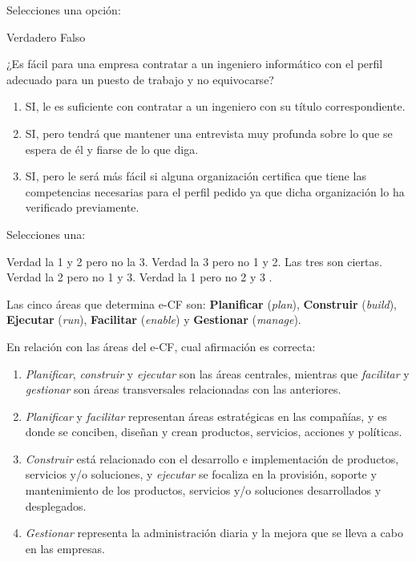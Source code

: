 \documentclass[a4paper]{exam}
\begin{document}
\begin{questions}
  
  Selecciones una opción:

  \begin{choices}
    \CorrectChoice Verdadero
    \choice Falso
  \end{choices}

\question ¿Es fácil para una empresa contratar a un ingeniero
  informático con el perfil adecuado para un puesto de trabajo y no
  equivocarse?

  \begin{enumerate}
  \item SI, le es suficiente con contratar a un  ingeniero con su título correspondiente.
  \item SI, pero   tendrá que mantener una entrevista muy profunda sobre lo que se espera de él  y fiarse de lo que diga.
  \item SI, pero le será más fácil si alguna organización certifica que tiene las competencias necesarias para  el perfil pedido ya que dicha organización lo ha verificado previamente.
  \end{enumerate}

  
  Selecciones una:
  
  \begin{choices}
    \choice Verdad la 1 y 2 pero no la 3.
    \CorrectChoice Verdad la 3 pero no 1 y 2.
    \choice Las tres son ciertas.
    \choice Verdad  la  2 pero no 1 y 3.
    \choice Verdad  la 1 pero no  2 y 3 .
  \end{choices}

\question Las cinco áreas que determina e-CF son:
  \textbf{Planificar} (\emph{plan}), \textbf{Construir}
  (\emph{build}), \textbf{Ejecutar} (\emph{run}), \textbf{Facilitar}
  (\emph{enable}) y \textbf{Gestionar} (\emph{manage}).

  En relación con las áreas del e-CF, cual afirmación es correcta:

  \begin{enumerate}
  \item \emph{Planificar}, \emph{construir} y \emph{ejecutar}
    son las áreas centrales, mientras que \emph{facilitar} y
    \emph{gestionar} son áreas transversales relacionadas con las
    anteriores.
  \item \emph{Planificar} y \emph{facilitar} representan áreas
    estratégicas en las compañías, y es donde se conciben, diseñan y
    crean productos, servicios, acciones y políticas.  
  \item \emph{Construir} está relacionado con el desarrollo e
    implementación de productos, servicios y/o soluciones, y
    \emph{ejecutar} se focaliza en la provisión, soporte y
    mantenimiento de los productos, servicios y/o soluciones
    desarrollados y desplegados.
  \item \emph{Gestionar} representa la administración diaria y la mejora que se lleva a cabo en las empresas.  
  \end{enumerate}


\end{questions}
\end{document}

